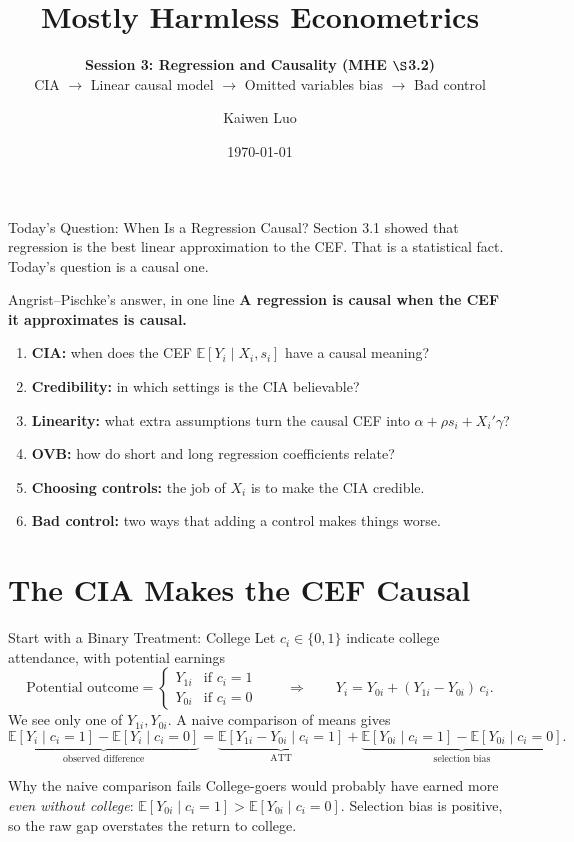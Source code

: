 \documentclass[aspectratio=169,11pt]{beamer}
\title{Mostly Harmless Econometrics}
\subtitle{\textbf{Session 3: Regression and Causality (MHE \ensuremath{\S}3.2)}\\[0.55em]
CIA $\rightarrow$ Linear causal model $\rightarrow$ Omitted variables bias $\rightarrow$ Bad control}
\author{Kaiwen Luo}
\institute{Washington University in St.Louis}
\date{\today}
\newcommand{\E}{\mathbb{E}}
\begin{document}
\begin{frame}\titlepage\end{frame}

\begin{frame}{Today's Question: When Is a Regression Causal?}
\small
Section 3.1 showed that regression is the best linear approximation to the CEF.
That is a statistical fact. Today's question is a causal one.
\medskip
\begin{block}{Angrist--Pischke's answer, in one line}
\centering
\textbf{A regression is causal when the CEF it approximates is causal.}
\end{block}
\medskip
\begin{enumerate}
\setlength{\itemsep}{0.25em}
\item \textbf{CIA:} when does the CEF $\E[Y_i\mid X_i,s_i]$ have a causal meaning?
\item \textbf{Credibility:} in which settings is the CIA believable?
\item \textbf{Linearity:} what extra assumptions turn the causal CEF into $\alpha+\rho s_i+X_i'\gamma$?
\item \textbf{OVB:} how do short and long regression coefficients relate?
\item \textbf{Choosing controls:} the job of $X_i$ is to make the CIA credible.
\item \textbf{Bad control:} two ways that adding a control makes things worse.
\end{enumerate}
\end{frame}

\section{The CIA Makes the CEF Causal}
\begin{frame}{Start with a Binary Treatment: College}
\small
Let $c_i\in\{0,1\}$ indicate college attendance, with potential earnings
\[
\text{Potential outcome}=
\begin{cases}
Y_{1i} & \text{if } c_i=1\\
Y_{0i} & \text{if } c_i=0
\end{cases}
\qquad\Longrightarrow\qquad
Y_i=Y_{0i}+(Y_{1i}-Y_{0i})\,c_i .
\]
We see only one of $Y_{1i},Y_{0i}$. A naive comparison of means gives
\[
\underbrace{\E[Y_i\mid c_i=1]-\E[Y_i\mid c_i=0]}_{\text{observed difference}}
=\underbrace{\E[Y_{1i}-Y_{0i}\mid c_i=1]}_{\text{ATT}}
+\underbrace{\E[Y_{0i}\mid c_i=1]-\E[Y_{0i}\mid c_i=0]}_{\text{selection bias}}.
\tag{3.2.1}
\]
\begin{block}{Why the naive comparison fails}
College-goers would probably have earned more \emph{even without college}: $\E[Y_{0i}\mid c_i=1]>\E[Y_{0i}\mid c_i=0]$.
Selection bias is positive, so the raw gap \alert{overstates} the return to college.
\end{block}
\end{frame}
\end{document}
